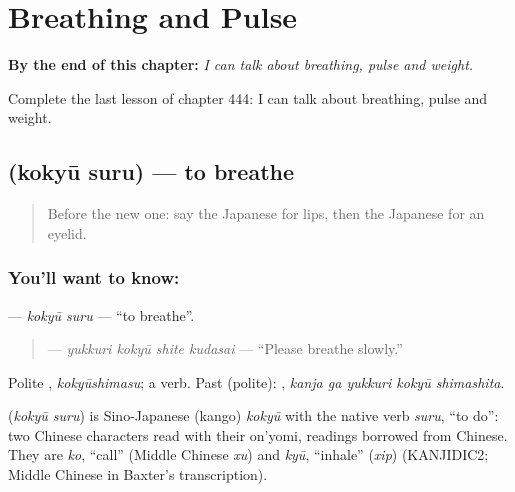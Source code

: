 
\chapter{Breathing and Pulse}
\label{ch:ja-breathing-and-pulse}

\begin{chapteropening}
\textbf{By the end of this chapter:} \emph{I can talk about breathing, pulse and weight.}

Complete the last lesson of chapter 444: I can talk about breathing, pulse and weight.
\end{chapteropening}

\section[\texorpdfstring{\ja{こきゅうする} (kokyū suru)}{こきゅうする (kokyū suru)}]{ (kokyū suru) — to breathe}

\label{lesson:JA-C444-kokyuu-suru}



\begin{quote}
Before the new one: say the Japanese for lips, then the Japanese for an eyelid.
\end{quote}

\subsection*{You'll want to know: }
\textbf{} — \emph{kokyū suru} — \textquotedblleft{}to breathe\textquotedblright{}.

\begin{quote}
\textbf{  } — \emph{yukkuri kokyū shite kudasai} — \textquotedblleft{}Please breathe slowly.\textquotedblright{}
\end{quote}

Polite \textbf{}, \emph{kokyūshimasu}; a  verb. Past (polite): \textbf{  }, \emph{kanja ga yukkuri kokyū shimashita}.

\begin{cousinweb}
\textbf{} (\emph{kokyū suru}) is Sino-Japanese (kango) \emph{kokyū} with the native verb \emph{suru}, \textquotedblleft{}to do\textquotedblright{}: two Chinese characters read with their on'yomi, readings borrowed from Chinese. They are \emph{ko}, \textquotedblleft{}call\textquotedblright{} (Middle Chinese \emph{xu}) and \emph{kyū}, \textquotedblleft{}inhale\textquotedblright{} (\emph{xip}) (KANJIDIC2; Middle Chinese in Baxter's transcription).
\end{cousinweb}

